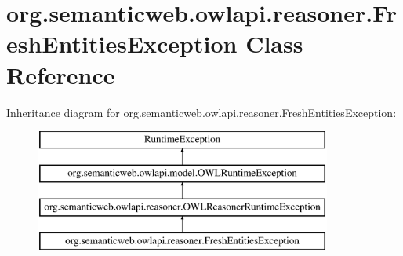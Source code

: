 \hypertarget{classorg_1_1semanticweb_1_1owlapi_1_1reasoner_1_1_fresh_entities_exception}{\section{org.\-semanticweb.\-owlapi.\-reasoner.\-Fresh\-Entities\-Exception Class Reference}
\label{classorg_1_1semanticweb_1_1owlapi_1_1reasoner_1_1_fresh_entities_exception}
}
Inheritance diagram for org.\-semanticweb.\-owlapi.\-reasoner.\-Fresh\-Entities\-Exception\-:\begin{figure}[H]
\begin{center}
\leavevmode
\includegraphics[height=4.000000cm]{classorg_1_1semanticweb_1_1owlapi_1_1reasoner_1_1_fresh_entities_exception}
\end{center}
\end{figure}
